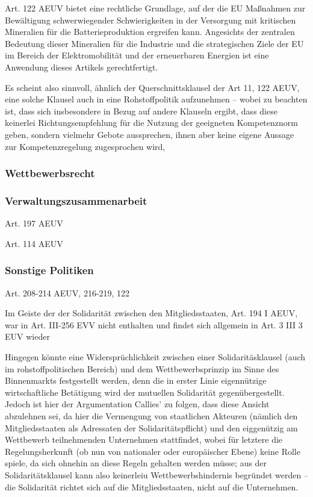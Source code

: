 \documentclass[12pt,a4paper,oneside]{book} %
\begin{document}
	Art. 122 AEUV bietet eine rechtliche Grundlage, auf der die EU Maßnahmen zur Bewältigung schwerwiegender Schwierigkeiten in der Versorgung mit kritischen Mineralien für die Batterieproduktion ergreifen kann. Angesichts der zentralen Bedeutung dieser Mineralien für die Industrie und die strategischen Ziele der EU im Bereich der Elektromobilität und der erneuerbaren Energien ist eine Anwendung dieses Artikels gerechtfertigt.
	
	Es scheint also sinnvoll, ähnlich der Querschnittsklausel der Art 11, 122 AEUV, eine solche Klausel auch in eine Rohstoffpolitik aufzunehmen -- wobei zu beachten ist, dass sich insbesondere in Bezug auf andere Klauseln ergibt, dass diese keinerlei Richtungsempfehlung für die Nutzung der geeigneten Kompetenznorm geben, sondern vielmehr Gebote aussprechen, ihnen aber keine eigene Aussage zur Kompetenzregelung zugesprochen wird,\autocite[39]{callies_umweltrecht_2022}
	
	
	\subsubsection{Wettbewerbsrecht}
	
	\subsubsection{Verwaltungszusammenarbeit}
	Art. 197 AEUV
	
	Art. 114 AEUV
	
	\subsubsection{Sonstige Politiken}
	Art. 208-214 AEUV, 216-219, 122
	
	Im Geiste der der Solidarität zwischen den Mitgliedsstaaten, Art. 194 I AEUV, war in Art. III-256 EVV nicht enthalten und findet sich allgemein in Art. 3 III 3 EUV wieder
	
	Hingegen könnte eine Widersprüchlichkeit zwischen einer Solidaritäsklausel (auch im rohstoffpolitischen Bereich) und dem Wettbewerbsprinzip im Sinne des Binnenmarkts festgestellt werden, denn die in erster Linie eigennützige wirtschaftliche Betätigung wird der mutuellen Solidarität gegenübergestellt.\autocite{Ehricke/Hackländer: ZEuS 2008, S. 579, 595f.} Jedoch ist hier der Argumentation Callies' zu folgen, dass diese Ansicht abzulehnen sei, da hier die Vermengung von staatlichen Akteuren (nämlich den Mitgliedsstaaten als Adressaten der Solidaritätspflicht) und den eiggenützig am Wettbewerb teilnehmenden Unternehmen stattfindet, wobei für letztere die Regelungsherkunft (ob nun von nationaler oder europäischer Ebene) keine Rolle spiele, da sich ohnehin an diese Regeln gehalten werden müsse; aus der Solidaritätsklausel kann also keinerleiu Wettbewerbshindernis begründet werden -- die Solidarität richtet sich auf die Mitgliedsstaaten, nicht auf die Unternehmen.
	
\end{document}
